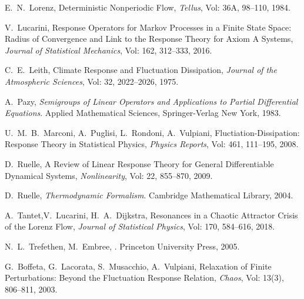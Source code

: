 \begin{thebibliography}{9999}
E.~N.~Lorenz, Deterministic Nonperiodic Flow, \emph{Tellus}, Vol: 36A, 98--110, 1984.

V.~Lucarini, Response Operators for Markov Processes in a Finite State Space: Radius of Convergence and Link to the Response Theory for Axiom A Systems, \emph{Journal of Statistical Mechanics}, Vol: 162, 312--333, 2016.

C.~E.~Leith, Climate Response and Fluctuation Dissipation, \emph{Journal of the Atmospheric Sciences}, Vol: 32, 2022--2026, 1975.

A.~Pazy, \emph{Semigroups of Linear Operators and Applications to Partial Differential Equations}. Applied Mathematical Sciences, Springer-Verlag New York, 1983.

U.~M.~B.~Marconi, A.~Puglisi, L.~Rondoni, A.~Vulpiani, Fluctiation-Dissipation: Response Theory in Statistical Physics, \emph{Physics Reports}, Vol: 461, 111--195, 2008.

D.~Ruelle, A Review of Linear Response Theory for General Differentiable Dynamical Systems, \emph{Nonlinearity}, Vol: 22, 855--870, 2009.

D.~Ruelle, \emph{Thermodynamic Formalism}. Cambridge Mathematical Library, 2004.

A.~Tantet,V.~Lucarini, H.~A.~Dijkstra, Resonances in a Chaotic Attractor Crisis of the Lorenz Flow, \emph{Journal of Statistical Physics}, Vol: 170, 584--616, 2018.

N.~L.~Trefethen, M.~Embree, .
\newblock Princeton University Press, 2005.

G.~Boffeta, G.~Lacorata, S.~Musacchio, A.~Vulpiani, Relaxation of Finite Perturbations: Beyond the Fluctuation Response Relation, \emph{Chaos}, Vol: 13(3), 806--811, 2003.

\end{thebibliography} 